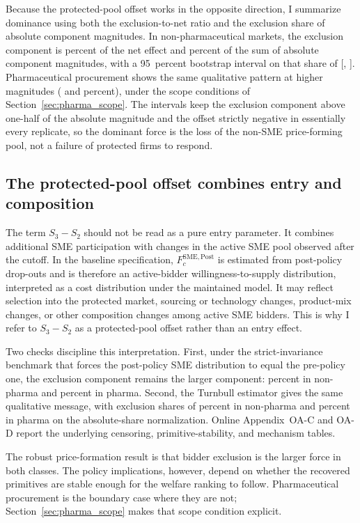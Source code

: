 Because the protected-pool offset works in the opposite direction, I
summarize dominance using both the exclusion-to-net ratio and the exclusion
share of absolute component magnitudes. In non-pharmaceutical markets, the
exclusion component is \bneIntensRelNetNp{} percent of the net effect and
\bneShareIntensNp{} percent of the sum of absolute component magnitudes,
with a 95~percent bootstrap interval on that share of
[\bneCiShareLoNp{}, \bneCiShareHiNp{}].
Pharmaceutical procurement shows the same qualitative pattern at higher
magnitudes (\bneIntensRelNetPh{} and \bneShareIntensPh{} percent), under
the scope conditions of Section~\ref{sec:pharma_scope}. The intervals keep
the exclusion component above one-half of the absolute magnitude and the
offset strictly negative in essentially every replicate, so the dominant
force is the loss of the non-SME price-forming pool, not a failure of
protected firms to respond.

\subsection{The protected-pool offset combines entry and composition}

The term $S_3-S_2$ should not be read as a pure entry parameter. It combines
additional SME participation with changes in the active SME pool observed
after the cutoff. In the baseline specification, $F_c^{\mathrm{SME,Post}}$
is estimated from post-policy drop-outs and is therefore an active-bidder
willingness-to-supply distribution, interpreted as a cost distribution
under the maintained model. It may reflect selection into the protected
market, sourcing or technology changes, product-mix changes, or other
composition changes among active SME bidders. This is why I refer to
$S_3-S_2$ as a protected-pool offset rather than an entry effect.

Two checks discipline this interpretation. First, under the strict-invariance
benchmark that forces the post-policy SME distribution to equal the
pre-policy one, the exclusion component remains the larger component:
\strictShareNp{} percent in non-pharma and \strictSharePh{} percent in
pharma. Second, the Turnbull estimator gives the same qualitative message,
with exclusion shares of \turnbullShareNp{} percent in non-pharma and
\turnbullSharePh{} percent in pharma on the absolute-share normalization.
Online Appendix~OA-C and OA-D report the underlying censoring,
primitive-stability, and mechanism tables.

The robust price-formation result is that bidder exclusion is the larger
force in both classes. The policy implications, however, depend on whether
the recovered primitives are stable enough for the welfare ranking to
follow. Pharmaceutical procurement is the boundary case where they are not;
Section~\ref{sec:pharma_scope} makes that scope condition explicit.

